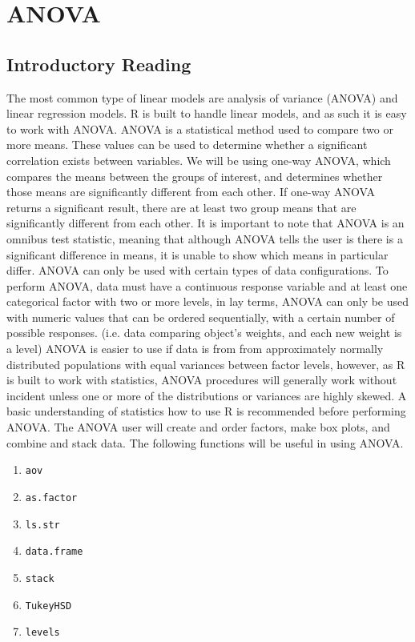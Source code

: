 \chapter{ANOVA}
\section{Introductory Reading}


The most common type of linear models are analysis of variance (ANOVA) and linear regression models. 
R is built to handle linear models, and as such it is easy to work with ANOVA. 
ANOVA is a statistical method used to compare two or more means. 
These values can be used to determine whether a significant correlation exists between variables. 
We will be using one-way ANOVA, which compares the means between the groups of interest, and determines whether those means are significantly different from each other. 
If one-way ANOVA returns a significant result, there are at least two group means that are significantly different from each other. 
It is important to note that ANOVA is an omnibus test statistic, meaning that although ANOVA tells the user is there is a significant difference in means, it is unable to show which means in particular differ.
ANOVA can only be used with certain types of data configurations. 
To perform ANOVA, data must have a continuous response variable and at least one categorical factor with two or more levels, in lay terms, ANOVA can only be used with numeric values that can be ordered sequentially, with a certain number of possible responses. 
(i.e. data comparing object's weights, and each new weight is a level) 
ANOVA is easier to use if data is from from approximately normally distributed populations with equal variances between factor levels, however, as R is built to work with statistics, ANOVA procedures will generally work without incident unless one or more of the distributions or variances are highly skewed.
A basic understanding of statistics how to use R is recommended before performing ANOVA. The ANOVA user will create and order factors, make box plots, and combine and stack data. 
\cite{CRANR}
The following functions will be useful in using ANOVA.
\begin{enumerate}
        \item \texttt{aov}
        \item \texttt{as.factor}
        \item \texttt{ls.str}
        \item \texttt{data.frame}
        \item \texttt{stack}
        \item \texttt{TukeyHSD}
\item \texttt{levels}
\end{enumerate}

